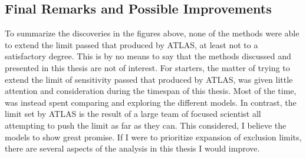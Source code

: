 \subsection*{Final Remarks and Possible Improvements}
To summarize the discoveries in the figures above, none of the methods were able to extend the limit passed that produced by \ac{ATLAS}, at least not to a satisfactory degree.
This is by no means to say that the methods discussed and presented in this thesis are not of interest. For starters, the matter of trying to extend the limit of sensitivity 
passed that produced by \ac{ATLAS}, was given little attention and consideration during the timespan of this thesis. Most of the time, was instead spent comparing and exploring the 
different models. In contrast, the limit set by \ac{ATLAS} is the result of a large team of focused scientist all attempting to push the limit as far as they can. This considered, I believe 
the models to show great promise. If I were to prioritize expansion of exclusion limits, there are several aspects of the analysis in this thesis I would improve.
